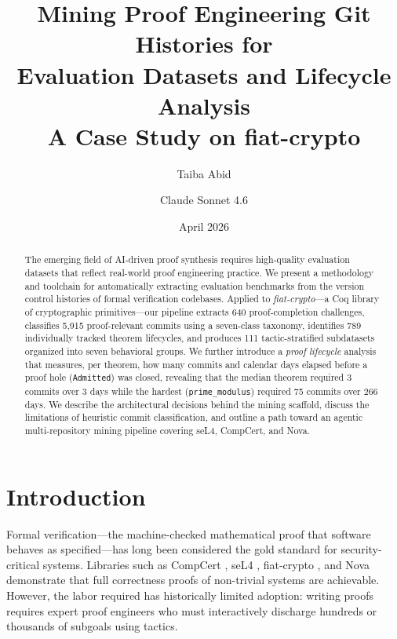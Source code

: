 \documentclass[11pt]{article}
\title{\textbf{Mining Proof Engineering Git Histories for\\
Evaluation Datasets and Lifecycle Analysis}\\[0.5em]
\large A Case Study on fiat-crypto}
\author{
  Taiba Abid \and Claude Sonnet 4.6
}
\date{April 2026}
\begin{document}
\maketitle

\begin{abstract}
The emerging field of AI-driven proof synthesis requires high-quality evaluation datasets that reflect real-world proof engineering practice. We present a methodology and toolchain for automatically extracting evaluation benchmarks from the version control histories of formal verification codebases. Applied to \textit{fiat-crypto}---a Coq library of cryptographic primitives---our pipeline extracts 640 proof-completion challenges, classifies 5,915 proof-relevant commits using a seven-class taxonomy, identifies 789 individually tracked theorem lifecycles, and produces 111 tactic-stratified subdatasets organized into seven behavioral groups. We further introduce a \textit{proof lifecycle} analysis that measures, per theorem, how many commits and calendar days elapsed before a proof hole (\texttt{Admitted}) was closed, revealing that the median theorem required 3 commits over 3 days while the hardest (\texttt{prime\_modulus}) required 75 commits over 266 days. We describe the architectural decisions behind the mining scaffold, discuss the limitations of heuristic commit classification, and outline a path toward an agentic multi-repository mining pipeline covering seL4, CompCert, and Nova.
\end{abstract}

\tableofcontents
\newpage

\section{Introduction}

Formal verification---the machine-checked mathematical proof that software behaves as specified---has long been considered the gold standard for security-critical systems. Libraries such as CompCert \citep{leroy2009formally}, seL4 \citep{klein2009sel4}, fiat-crypto \citep{erbsen2019simple}, and Nova \citep{kothapalli2022nova} demonstrate that full correctness proofs of non-trivial systems are achievable. However, the labor required has historically limited adoption: writing proofs requires expert proof engineers who must interactively discharge hundreds or thousands of subgoals using tactics.
\end{document}
